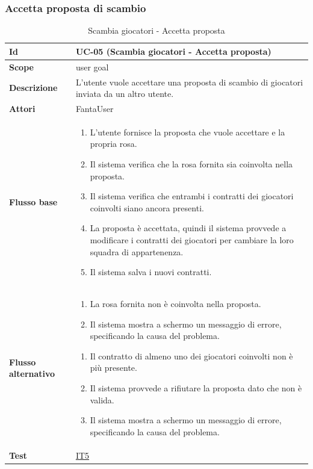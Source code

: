 \subsubsection{Accetta proposta di scambio}
\begin{table}[H]
\caption{Scambia giocatori - Accetta proposta}
\label{UC-05}

\begin{tabularx}{\textwidth}{|l|X|}
\hline
\textbf{Id} & UC-05 (Scambia giocatori - Accetta proposta) \\
\hline
\textbf{Scope} & user goal \\
\hline
\textbf{Descrizione} & L'utente vuole accettare una proposta di scambio di giocatori inviata da un altro utente. \\
\hline
\textbf{Attori} & FantaUser \\
\hline
\textbf{Flusso base} &
\begin{enumerate}[leftmargin=*]
    \item L'utente fornisce la proposta che vuole accettare e la propria rosa.
    \item Il sistema verifica che la rosa fornita sia coinvolta nella proposta.
    \item Il sistema verifica che entrambi i contratti dei giocatori coinvolti siano ancora presenti.
    \item La proposta è accettata, quindi il sistema provvede a modificare i contratti dei giocatori
            per cambiare la loro squadra di appartenenza.
    \item Il sistema salva i nuovi contratti. 
\end{enumerate} \\
\hline
\textbf{Flusso alternativo} &
\begin{enumerate}[leftmargin=*,label=2.\arabic*]
    \item La rosa fornita non è coinvolta nella proposta.
    \item Il sistema mostra a schermo un messaggio di errore, specificando la causa del problema.
\end{enumerate}
\begin{enumerate}[leftmargin=*,label=3.\arabic*]
    \item Il contratto di almeno uno dei giocatori coinvolti non è più presente.
    \item Il sistema provvede a rifiutare la proposta dato che non è valida.
    \item Il sistema mostra a schermo un messaggio di errore, specificando la causa del problema.
\end{enumerate} \\
\hline
\textbf{Test} & \hyperref[IT5]{IT5} \\
\hline
\end{tabularx}

\end{table}



